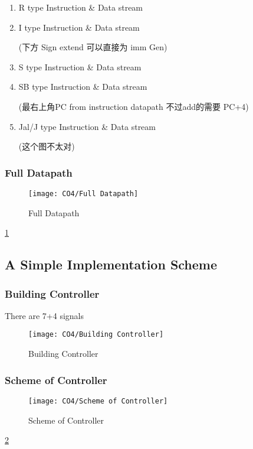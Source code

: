 \begin{enumerate}
    \item R type Instruction \& Data stream
    \item I type Instruction \& Data stream
    
    (下方 Sign extend 可以直接为 imm Gen)
    \item S type Instruction \& Data stream
    \item SB type Instruction \& Data stream
    
    (最右上角PC from instruction datapath 不过add的需要 PC+4)
    \item Jal/J type Instruction \& Data stream
    
    (这个图不太对)
\end{enumerate}

\subsubsection{Full Datapath}
\begin{figure}[!htb]
    \centering
    \texttt{[image: CO4/Full Datapath]}
    \caption{Full Datapath}
    \label{Full Datapath}
\end{figure}
\ref{Full Datapath}

\subsection{A Simple Implementation Scheme}
\subsubsection{Building Controller}
There are 7+4 signals

\begin{figure}[!htb]
    \centering
    \texttt{[image: CO4/Building Controller]}
    \caption{Building Controller}
\end{figure}

\subsubsection{Scheme of Controller}
\begin{figure}[!htb]
    \centering
    \texttt{[image: CO4/Scheme of Controller]}
    \caption{Scheme of Controller}
    \label{Scheme of Controller}
\end{figure}
\ref{Scheme of Controller}

